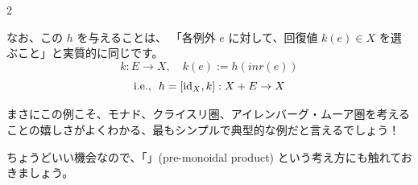 \documentclass[
		head_space=20mm,
		foot_space=20mm,
		gutter=10mm,
		line_length=190mm
]{jlreq}
\begin{document}
\begin{oframed}
\begin{itemize}
\begin{multicols}{2}
\begin{center}
		\end{center}
		\begin{center}
		\end{center}
	\end{multicols}
	\noindent なお、この $h$ を与えることは、
	「各例外 $e$ に対して、回復値 $k(e)\in X$ を選ぶこと」と実質的に同じです。
	\[k:E\to X,\quad k(e):=h(inr(e))\]
	\[\textrm{i.e.,}~~ h=[\mathrm{id}_X,k]:X+E\to X\]
\end{itemize}
\end{oframed}

\noindent まさにこの例こそ、モナド、クライスリ圏、アイレンバーグ・ムーア圏を考えることの嬉しさがよくわかる、最もシンプルで典型的な例だと言えるでしょう！

\clearpage

\noindent 
ちょうどいい機会なので、「」(pre-monoidal product) という考え方にも触れておきましょう。
\end{document}
